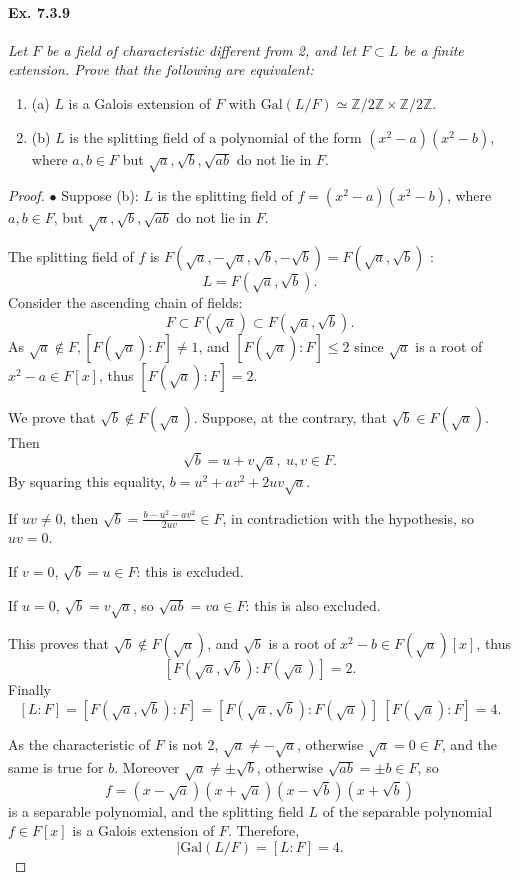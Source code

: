 \documentclass[11pt,a4paper]{article}
\newcommand{\be} {\begin{enumerate}}
\newcommand{\ee} {\end{enumerate}}
\newcommand{\Z}{\mathbb{Z}}
\newcommand{\Gal}{\mathrm{Gal}}
\begin{document}
\paragraph{Ex. 7.3.9}

{\it Let $F$ be a field of characteristic different from 2, and let $F\subset L$ be a finite extension. Prove that the following are equivalent:
\be
\item[(a)] $L$ is a Galois extension of $F$ with $\Gal(L/F)\simeq \Z/2\Z\times \Z/2\Z$.
\item[(b)] $L$ is the splitting field of a polynomial of the form $(x^2-a)(x^2-b)$, where $a,b \in F$ but $\sqrt{a},\sqrt{b},\sqrt{ab}$ do not lie in $F$.
\ee
}

\begin{proof}
$\bullet$ Suppose (b): $L$ is the splitting field of $f=(x^2-a)(x^2-b)$, where $a,b \in F$, but $\sqrt{a},\sqrt{b},\sqrt{ab}$ do not lie in $F$.

The splitting field of $f$ is $F(\sqrt{a}, -\sqrt{a},\sqrt{b},-\sqrt{b}) = F(\sqrt{a},\sqrt{b})$ :
$$L =  F(\sqrt{a},\sqrt{b}).$$
Consider the ascending chain of fields:
$$F \subset F(\sqrt{a}) \subset F(\sqrt{a}, \sqrt{b}).$$
As $\sqrt{a} \not \in F, [ F(\sqrt{a}):F]\neq 1$, and $[ F(\sqrt{a}):F] \leq 2$ since $\sqrt{a}$ is a root of $x^2-a \in F[x]$, thus $[ F(\sqrt{a}):F] = 2$.

We prove that $\sqrt{b} \not \in F(\sqrt{a})$. Suppose, at the contrary, that $\sqrt{b} \in F(\sqrt{a})$. Then
$$\sqrt{b} = u+v\sqrt{a}, \ u,v \in F.$$
By squaring this equality, $b =u^2+av^2+2uv\sqrt{a}$.

If $uv\neq 0$, then $\sqrt{b} = \frac{b - u^2 -av^2}{2uv} \in F$, in contradiction with the hypothesis, so $uv=0$.

If $v=0$, $\sqrt{b} = u \in F$: this is excluded.

If $u=0$, $\sqrt{b} = v \sqrt{a}$, so $\sqrt{ab} = va \in F$: this is also excluded.

This proves that $\sqrt{b} \not \in F(\sqrt{a})$, and $\sqrt{b}$ is a root of $x^2-b \in F(\sqrt{a})[x]$, thus $$[F(\sqrt{a},\sqrt{b}):F(\sqrt{a})]=2.$$
Finally
$$[L:F] = [F(\sqrt{a},\sqrt{b}):F] = [F(\sqrt{a},\sqrt{b}):F(\sqrt{a})]\ [ F(\sqrt{a}):F] = 4.$$

As the characteristic of $F$ is not 2, $\sqrt{a} \neq -\sqrt{a}$, otherwise $\sqrt{a}=0 \in F$, and the same is true for $b$. Moreover $\sqrt{a} \ne \pm \sqrt{b}$, otherwise $\sqrt{ab} = \pm b \in F$, so
$$f = (x-\sqrt{a})(x+\sqrt{a})(x-\sqrt{b})(x+\sqrt{b})$$
is a separable polynomial, and the splitting field $L$ of the separable polynomial $f \in F[x]$ is a Galois extension of $F$. Therefore, 
$$\vert \Gal(L/F) = [L:F] = 4.$$


\end{proof}
\end{document}
